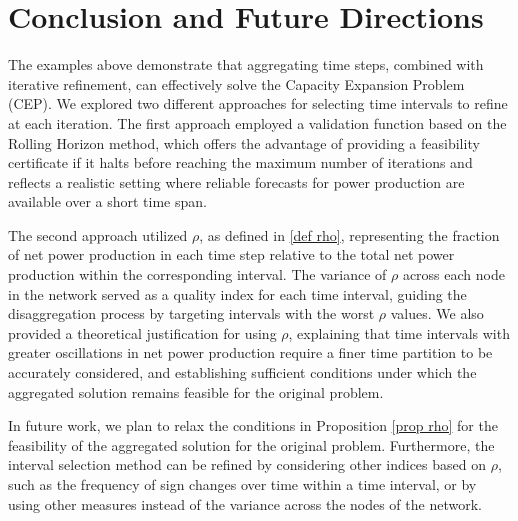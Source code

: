 {\section{Conclusion and Future Directions}

The examples above demonstrate that aggregating time steps, combined with iterative refinement, can effectively solve the Capacity Expansion Problem (CEP). We explored two different approaches for selecting time intervals to refine at each iteration. The first approach employed a validation function based on the Rolling Horizon method, which offers the advantage of providing a feasibility certificate if it halts before reaching the maximum number of iterations and reflects a realistic setting where reliable forecasts for power production are available over a short time span.

The second approach utilized \(\rho\), as defined in \ref{def rho}, representing the fraction of net power production in each time step relative to the total net power production within the corresponding interval. The variance of \(\rho\) across each node in the network served as a quality index for each time interval, guiding the disaggregation process by targeting intervals with the worst \(\rho\) values. We also provided a theoretical justification for using \(\rho\), explaining that time intervals with greater oscillations in net power production require a finer time partition to be accurately considered, and establishing sufficient conditions under which the aggregated solution remains feasible for the original problem.

In future work, we plan to relax the conditions in Proposition \ref{prop rho} for the feasibility of the aggregated solution for the original problem. Furthermore, the interval selection method can be refined by considering other indices based on \(\rho\), such as the frequency of sign changes over time within a time interval, or by using other measures instead of the variance across the nodes of the network.














%
%


}
